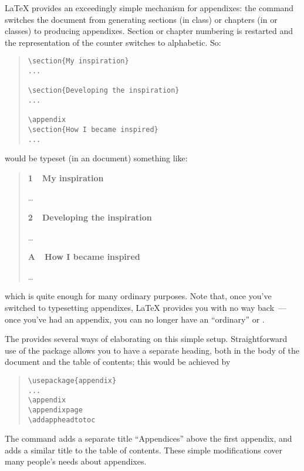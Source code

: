 
\LaTeX{} provides an exceedingly simple mechanism for appendixes: the
command  switches the document from generating sections
(in  class) or chapters (in  or
 classes) to producing appendixes.  Section or chapter
numbering is restarted and the representation of the counter switches
to alphabetic.  So:
\begin{quote}
\begin{verbatim}
\section{My inspiration}
...

\section{Developing the inspiration}
...

\appendix
\section{How I became inspired}
...
\end{verbatim}
\end{quote}
would be typeset (in an  document) something like:
\begin{quote}
\textbf{1~~My inspiration}

\dots{}

\textbf{2~~Developing the inspiration}

\dots{}

\textbf{A~~How I became inspired}

\dots{}
\end{quote}
which is quite enough for many ordinary purposes.  Note that, once
you've switched to typesetting appendixes, \LaTeX{} provides you with
no way back~--- once you've had an appendix, you can no longer have an
``ordinary''  or .

The  provides several ways of elaborating on this
simple setup.  Straightforward use of the package allows you to have a
separate heading, both in the body of the document and the table of
contents; this would be achieved by
\begin{quote}
\begin{verbatim}
\usepackage{appendix}
...
\appendix
\appendixpage
\addappheadtotoc
\end{verbatim}
\end{quote}
The  command adds a separate title ``Appendices''
above the first appendix, and  adds a similar
title to the table of contents.  These simple modifications cover many
people's needs about appendixes.

